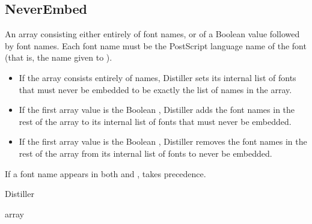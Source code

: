 \documentclass[letterpaper,12pt,english,openany,oneside]{sphinxmanual}
\begin{document}
\label{\detokenize{PDF_Create_CommonSettings:default-value-67}}

\begin{sphinxVerbatim}[commandchars=\\\{\}]
\end{sphinxVerbatim}




\subsection{NeverEmbed}
\label{\detokenize{PDF_Create_CommonSettings:neverembed}}
An array consisting either entirely of font names, or of a Boolean value followed by font names. Each font name must be the PostScript language name of the font (that is, the name given to  ).
\begin{itemize}
\item {} 
If the array consists entirely of names, Distiller sets its internal list of fonts that must never be embedded to be exactly the list of names in the array.

\item {} 
If the first array value is the Boolean  , Distiller adds the font names in the rest of the  array to its internal list of fonts that must never be embedded.

\item {} 
If the first array value is the Boolean  , Distiller removes the font names in the rest of the  array from its internal list of fonts to never be embedded.

\end{itemize}

If a font name appears in both  and  ,  takes precedence.

\label{\detokenize{PDF_Create_CommonSettings:supported-by-72}}

Distiller

\label{\detokenize{PDF_Create_CommonSettings:type-71}}

array

\label{\detokenize{PDF_Create_CommonSettings:ui-name-58}}
\end{document}
